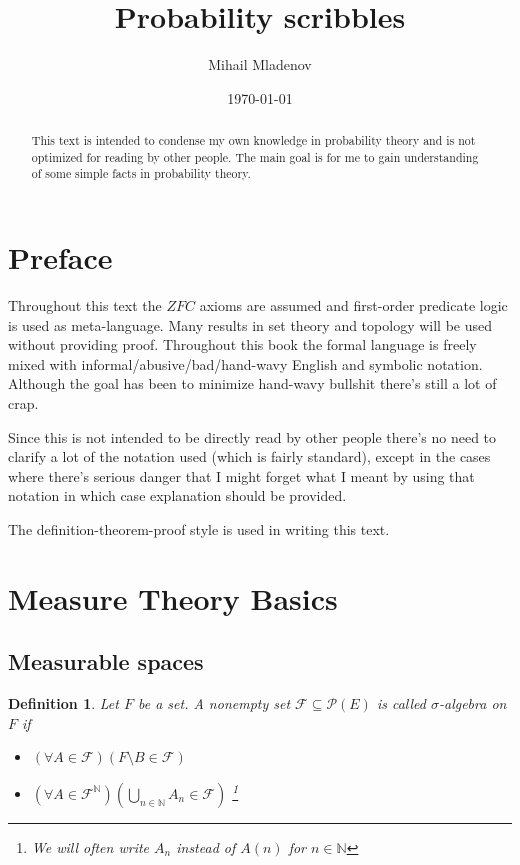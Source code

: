 \documentclass[a4paper]{amsart}
\newtheorem{deff}{Definition}
\newcommand{\pow}[1]{\mathscr{P}\left(#1\right)}
\newcommand{\NN}{\mathbb{N}}
\begin{document}
	
\author{Mihail Mladenov}
\title{Probability scribbles}
\date{\today}
 	
\begin{abstract}
    This text is intended to condense my own knowledge in 
    probability theory and is not optimized for reading by other 
    people. The main goal is for me to gain understanding of 
    some simple facts in probability theory.
\end{abstract}

\maketitle

\tableofcontents
\newpage

\section{Preface}

Throughout this text the $ZFC$ axioms are assumed and 
first-order predicate logic is used as meta-language. Many 
results in set theory and topology will be used without 
providing proof. Throughout this book the formal language is 
freely mixed with informal/abusive/bad/hand-wavy English 
and symbolic notation. Although the goal has been to 
minimize hand-wavy bullshit there's still a lot of crap. 

Since this is not intended to be directly read by other people 
there's no need to clarify a lot of the notation used (which is fairly standard),
except in the cases where there's serious danger that I might forget 
what I meant by using that notation in which case 
explanation should be provided.

The definition-theorem-proof style is used in writing this text.


\section{Measure Theory Basics}

\subsection{Measurable spaces}

\begin{deff}
    Let $F$ be a set. A nonempty set $\mathcal{F} \subseteq 
    \pow{E}$ is called $\sigma$-algebra on $F$ if
    
    \begin{itemize}
        \item $\left(\forall A \in \mathcal{F}\right)  \left( F 
        \setminus B \in \mathcal{F} \right)$
        \item $\left(\forall A \in \mathcal{F}^\NN\right) \left( 
        \bigcup\limits_{n\in \NN} A_n \in \mathcal{F} \right) $   
        \footnote{We will often write $A_n$ instead of $A(n)$ 
        for $n \in \NN$}
    \end{itemize}
\end{deff}
\end{document}
